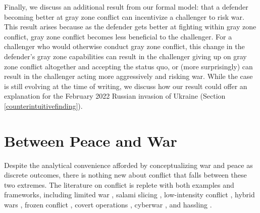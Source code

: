 \documentclass[11pt,letterpaper,pdftex,dvipsnames,table]{article}
\begin{document}
Finally, we discuss an additional result from our formal model: that a defender becoming better at gray zone conflict can incentivize a challenger to risk war. This result arises because as the defender gets better at fighting within gray zone conflict, gray zone conflict becomes less beneficial to the challenger. For a challenger who would otherwise conduct gray zone conflict, this change in the defender's gray zone capabilities can result in the challenger giving up on gray zone conflict altogether and accepting the status quo, or (more surprisingly) can result in the challenger acting more aggressively and risking war. While the case is still evolving at the time of writing, we discuss how our result could offer an explanation for the February 2022 Russian invasion of Ukraine (Section \ref{counterintuitivefinding}). 


\section{Between Peace and War} \label{litreview}
Despite the analytical convenience afforded by conceptualizing war and peace as discrete outcomes, there is nothing new about conflict that falls between these two extremes. The literature on conflict is replete with both examples and frameworks, including limited war \citep{kissinger_militarypolicydefense_1955, osgood_reappraisallimitedwar_1969}, salami slicing \citep{schelling_armsinfluence_1966}, low-intensity conflict \citep{turbiville_prefacefuturetrends_2002}, hybrid wars \citep{lanoszka_russianhybridwarfare_2016}, frozen conflict \citep{driscoll_friendsthesebrinkmanship_2016}, covert operations \citep{carson_secretwarscovert_2018, orourke_covertregimechange_2018}, cyberwar \citep{lindsay_coercioncyberspacestabilityinstability_2018}, and hassling \citep{schram_hasslinghowstates_2021}.
\end{document}
